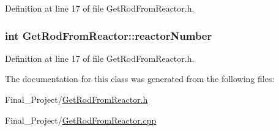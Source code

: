 Definition at line 17 of file Get\-Rod\-From\-Reactor.\-h.

\hypertarget{classGetRodFromReactor_ad2c4d389db38e728e540206aed467670}{
\subsubsection[{reactor\-Number}]{\setlength{\rightskip}{0pt plus 5cm}int Get\-Rod\-From\-Reactor\-::reactor\-Number\hspace{0.3cm}{\ttfamily [private]}}}\label{classGetRodFromReactor_ad2c4d389db38e728e540206aed467670}


Definition at line 17 of file Get\-Rod\-From\-Reactor.\-h.



The documentation for this class was generated from the following files\-:\begin{DoxyCompactItemize}
\item 
Final\-\_\-\-Project/\hyperlink{GetRodFromReactor_8h}{Get\-Rod\-From\-Reactor.\-h}\item 
Final\-\_\-\-Project/\hyperlink{GetRodFromReactor_8cpp}{Get\-Rod\-From\-Reactor.\-cpp}\end{DoxyCompactItemize}
